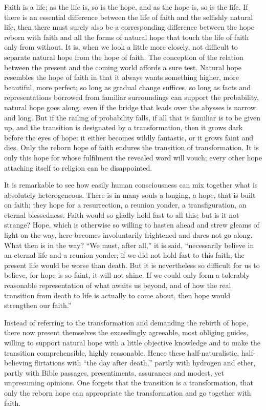 \documentclass[12pt,a4paper,openany]{book}
\newcommand{\opage}[1]{\marginnote{\footnotesize\textit{[#1]}}}
\begin{document}
Faith is a life; as the life is, so is the hope, and as the hope is, so is the life. If there is an essential
difference between the life of faith and the selfishly natural life, then there must surely also be a corresponding
\setcounter{footnote}{0}%
\opage{94}difference between the hope reborn with faith and all the forms of natural hope that touch the life of faith
only from without. It is, when we look a little more closely, not difficult to separate natural hope from the hope of
faith. The conception of the relation between the present and the coming world affords a sure test. Natural hope
resembles the hope of faith in that it always wants something higher, more beautiful, more perfect; so long as gradual
change suffices, so long as facts and representations borrowed from familiar surroundings can support the
probability, natural hope goes along, even if the bridge that leads over the abysses is narrow and long. But if the
railing of probability falls, if all that is familiar is to be given up, and the transition is designated by a
transformation, then it grows dark before the eyes of hope: it either becomes wildly fantastic, or it grows faint and
dies. Only the reborn hope of faith endures the transition of transformation. It is only this hope for whose
fulfilment the revealed word will vouch; every other hope attaching itself to religion can be disappointed.

It is remarkable to see how easily human consciousness can mix together what is absolutely heterogeneous. There is in
many souls a longing, a hope, that is built on faith; they hope for a resurrection, a reunion yonder, a
transfiguration, an eternal blessedness. Faith would so gladly hold fast to all this; but is it not strange? Hope,
which is otherwise so willing to hasten ahead and strew gleams of light on the way, here becomes involuntarily
frightened and dares not go along. What then is in the way? ``We must, after all,'' it is said, ``necessarily believe
in an eternal life and a reunion yonder; if we did not
\setcounter{footnote}{0}%
\opage{95}hold fast to this faith, the present life would be worse than death. But it is nevertheless so difficult for
us to believe, for hope is so faint, it will not shine. If we could only form a tolerably reasonable representation
of what awaits us beyond, and of how the real transition from death to life is actually to come about, then hope would
strengthen our faith.''

Instead of referring to the transformation and demanding the rebirth of hope, there now present themselves the
exceedingly agreeable, most obliging guides, willing to support natural hope with a little objective knowledge and to
make the transition comprehensible, highly reasonable. Hence these half-naturalistic, half-believing flirtations with
``the day after death,'' partly with hydrogen and ether, partly with Bible passages, presentiments, assurances and
modest, yet unpresuming opinions. One forgets that the transition is a transformation, that only the reborn hope can
appropriate the transformation and go together with faith.
\end{document}
